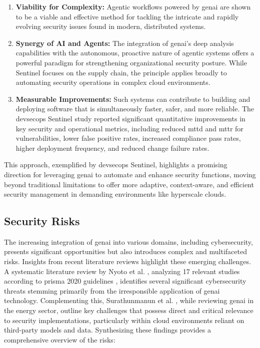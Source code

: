 \begin{enumerate}
\item \textbf{Viability for Complexity:} Agentic workflows powered by \gls{genai} are shown to be a viable and effective method for tackling the intricate and rapidly evolving security issues found in modern, distributed systems\cite{pillala_devsecops_2024}.
\item \textbf{Synergy of AI and Agents:} The integration of \gls{genai}'s deep analysis capabilities with the autonomous, proactive nature of agentic systems offers a powerful paradigm for strengthening organizational security posture\cite{pillala_devsecops_2024}. While Sentinel focuses on the supply chain, the principle applies broadly to automating security operations in complex cloud environments.
\item \textbf{Measurable Improvements:} Such systems can contribute to building and deploying software that is simultaneously faster, safer, and more reliable. The \gls{devsecops} Sentinel study reported significant quantitative improvements in key security and operational metrics, including reduced \gls{mttd} and \gls{mttr} for vulnerabilities, lower false positive rates, increased compliance pass rates, higher deployment frequency, and reduced change failure rates\cite{pillala_devsecops_2024}.
\end{enumerate}

This approach, exemplified by \gls{devsecops} Sentinel, highlights a promising direction for leveraging \gls{genai} to automate and enhance security functions, moving beyond traditional limitations to offer more adaptive, context-aware, and efficient security management in demanding environments like hyperscale clouds.


\subsection{Security Risks} %
\label{sec:Security Risks}

The increasing integration of \gls{genai} into various domains, including cybersecurity, presents significant opportunities but also introduces complex and multifaceted risks. Insights from recent literature reviews highlight these emerging challenges. A systematic literature review by Nyoto et al. \cite{nyoto_cyber_2024}, analyzing 17 relevant studies according to \gls{prisma} 2020 guidelines \cite{page_prisma_2021}, identifies several significant cybersecurity threats stemming primarily from the irresponsible application of \gls{genai} technology. Complementing this, Surathunmanun et al. \cite{surathunmanun_exploring_2024}, while reviewing \gls{genai} in the energy sector, outline key challenges that possess direct and critical relevance to security implementations, particularly within cloud environments reliant on third-party models and data. Synthesizing these findings provides a comprehensive overview of the risks:

